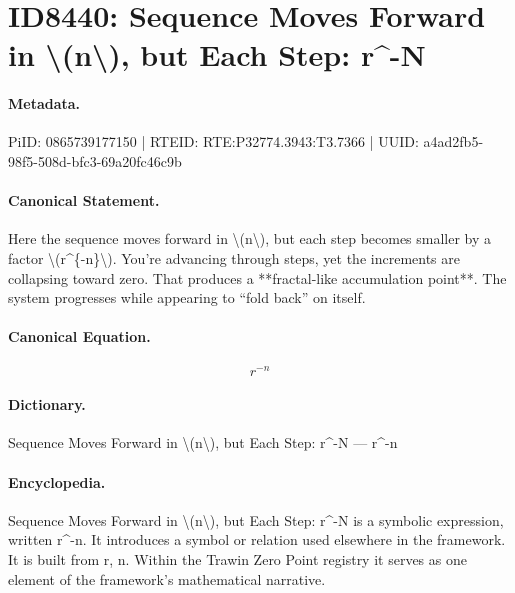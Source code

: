 \section*{ID8440: Sequence Moves Forward in \textbackslash{}(n\textbackslash{}), but Each Step: r\textasciicircum{}-N}
\paragraph{Metadata.}
PiID: 0865739177150 | RTEID: RTE:P32774.3943:T3.7366 | UUID: a4ad2fb5-98f5-508d-bfc3-69a20fc46c9b

\paragraph{Canonical Statement.}
Here the sequence moves forward in \textbackslash{}(n\textbackslash{}), but each step becomes smaller by a factor \textbackslash{}(r\textasciicircum{}\{-n\}\textbackslash{}). You’re advancing through steps, yet the increments are collapsing toward zero. That produces a **fractal-like accumulation point**. The system progresses while appearing to “fold back” on itself.

\paragraph{Canonical Equation.}
\[
r^{-n}
\]

\paragraph{Dictionary.}
Sequence Moves Forward in \textbackslash{}(n\textbackslash{}), but Each Step: r\textasciicircum{}-N — r\textasciicircum{}-n

\paragraph{Encyclopedia.}
Sequence Moves Forward in \textbackslash{}(n\textbackslash{}), but Each Step: r\textasciicircum{}-N is a symbolic expression, written r\textasciicircum{}-n. It introduces a symbol or relation used elsewhere in the framework. It is built from r, n. Within the Trawin Zero Point registry it serves as one element of the framework's mathematical narrative.
